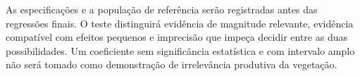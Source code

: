As especificações e a população de referência serão registradas antes das regressões finais. O teste distinguirá evidência de magnitude relevante, evidência compatível com efeitos pequenos e imprecisão que impeça decidir entre as duas possibilidades. Um coeficiente sem significância estatística e com intervalo amplo não será tomado como demonstração de irrelevância produtiva da vegetação.
